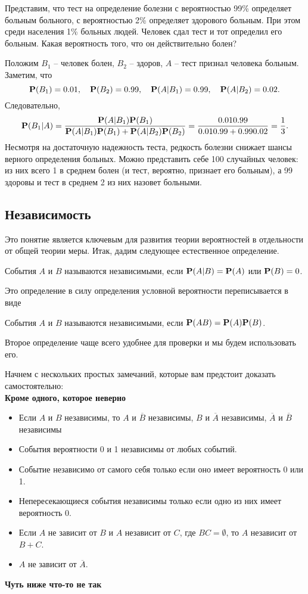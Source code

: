 \documentclass[11 pt,russian]{article}
\begin{document}
\begin{Exam}
Представим, что тест на определение болезни с вероятностью 99\% определяет больным больного, с вероятностью 2\% определяет здорового больным. При этом среди населения 1\% больных людей. Человек сдал тест и тот определил его больным. Какая вероятность того, что он действительно болен?

Положим $B_1$ -- человек болен, $B_2$ -- здоров, $A$ -- тест признал человека больным. Заметим, что
$$
{\bf P}(B_1) = 0.01,\quad
{\bf P}(B_2) = 0.99, \quad
{\bf P}(A|B_1) = 0.99,\quad
{\bf P}(A|B_2) = 0.02.
$$
Следовательно,
$$
{\bf P}(B_1|A) = \frac{{\bf P}(A|B_1) {\bf P}(B_1)}{{\bf P}(A|B_1) {\bf P}(B_1) + {\bf P}(A|B_2) {\bf P}(B_2)} = \frac{0.01 0.99}{0.01 0.99 + 0.99 0.02} = \frac{1}{3}.
$$
Несмотря на достаточную надежность теста, редкость болезни снижает шансы верного определения больных. Можно представить себе 100 случайных человек: из них всего 1 в среднем болен (и тест, вероятно, признает его больным), а 99 здоровы и тест в среднем 2 из них назовет больными.
\end{Exam}
\subsection{Независимость}
Это понятие является ключевым для развития теории вероятностей в отдельности от общей теории меры. Итак, дадим следующее естественное определение.
\begin{Def}
События $A$ и $B$ называются независимыми, если ${\bf P}(A|B) = {\bf P}(A)$ или ${\bf P}(B)=0$.
\end{Def}
Это определение в силу определения условной вероятности переписывается в виде
\begin{Def}
События $A$ и $B$ называются независимыми, если ${\bf P}(AB) = {\bf P}(A) {\bf P}(B)$.
\end{Def}
Второе определение чаще всего удобнее для проверки и мы будем использовать его.

Начнем с нескольких простых замечаний, которые вам предстоит доказать самостоятельно:\\
{\bf Кроме одного, которое неверно}
\begin{itemize}
\item Если $A$ и $B$ независимы, то $A$ и $\overline{B}$ независимы, $B$ и $\overline{A}$ независимы, $\overline{A}$ и $\overline{B}$ независимы
\item События вероятности 0 и 1 независимы от любых событий.
\item Событие независимо от самого себя только если оно имеет вероятность 0 или 1.
\item Непересекающиеся события независимы только если одно из них имеет вероятность 0.
\item Если $A$ не зависит от $B$ и $A$ независит от $C$, где $BC=\emptyset$, то $A$ независит от $B+C$.
\item $A$ не зависит от $\overline{A}$.
\end{itemize}
{\bf Чуть ниже что-то не так}
\end{document}
